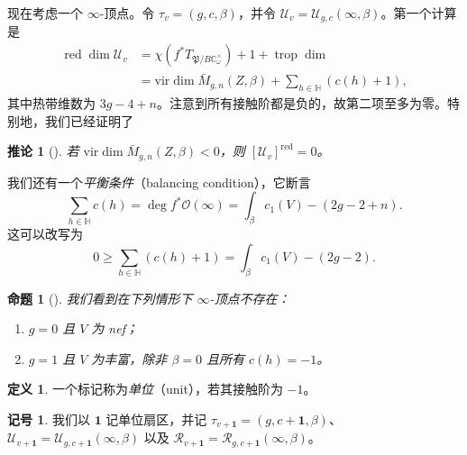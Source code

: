 \documentclass{amsart}
\newtheorem{cor}[thm]{推论}
\newtheorem{prop}[thm]{命题}
\theoremstyle{definition}
\newtheorem{defn}[thm]{定义}
\newtheorem{notn}[thm]{记号}
\theoremstyle{remark}
\theoremstyle{plain}
\theoremstyle{definition}
\theoremstyle{remark}
\newcommand{\C}{\mathbb{C}}
\renewcommand{\H}{\mathbb{H}}
\newcommand{\mc}[1]{\mathcal{#1}}
\newcommand{\mf}[1]{\mathfrak{#1}}
\newcommand{\mr}[1]{\mathrm{#1}}
\newcommand{\on}[1]{\operatorname{#1}}
\newcommand{\1}{\mathbf{1}}
\newcommand{\2}{\mathbf{2}}
\newcommand{\3}{\mathbf{3}}
\newcommand{\vir}{\mr{vir}}
\begin{document}
现在考虑一个 \(\infty\)-顶点。令 \(\tau_v = (g, c, \beta)\)，并令 \(\mc{U}_v = \mc{U}_{g,c}(\infty, \beta)\)。第一个计算是
\begin{align*}
    \on{red}\dim \mc{U}_v &= \chi(f^* T_{\mf{P}/B \C^{\times}_{\omega}}) + 1 + \on{trop}\dim  \\
    &= \vir\dim \bar{M}_{g,n}(Z, \beta) + \sum_{h \in \H } (c(h) + 1),
\end{align*}
其中热带维数为 \(3g-4+n\)。注意到所有接触阶都是负的，故第二项至多为零。特别地，我们已经证明了
\begin{cor}[{\cite{CJRpunctured}}]
    若 \(\vir\dim \bar{M}_{g,n}(Z,\beta) < 0\)，则 \([\mc{U}_v]^{\on{red}} = 0\)。
\end{cor}
我们还有一个\textit{平衡条件}（balancing condition），它断言
\begin{equation}\label{eqn:balancing condition}
    \sum_{h \in \H} c(h) = \deg f^* \mc{O}(\infty) = \int_{\beta} c_1(V) - (2g-2+n).
\end{equation}
这可以改写为
\[ 0 \geq \sum_{h \in \H} (c(h)+1) = \int_{\beta} c_1(V) - (2g-2). \]
\begin{prop}[{\cite{CJRpunctured}}]
    我们看到在下列情形下 \(\infty\)-顶点不存在：
    \begin{enumerate}
        \item \(g = 0\) 且 \(V\) 为 nef；
        \item \(g=1\) 且 \(V\) 为丰富，除非 \(\beta = 0\) 且所有 \(c(h) = -1\)。
    \end{enumerate}
\end{prop}

\begin{defn}
    一个标记称为\textit{单位}（unit），若其接触阶为 \(-1\)。
\end{defn}

\begin{notn}
    我们以 \(\1\) 记单位扇区，并记 \(\tau_{v+\1} = (g, c+\1, \beta)\)、\(\mc{U}_{v+\1} = \mc{U}_{g, c+\1}(\infty, \beta)\) 以及 \(\mc{R}_{v+\1} = \mc{R}_{g, c+\1}(\infty, \beta)\)。
\end{notn}
\end{document}
